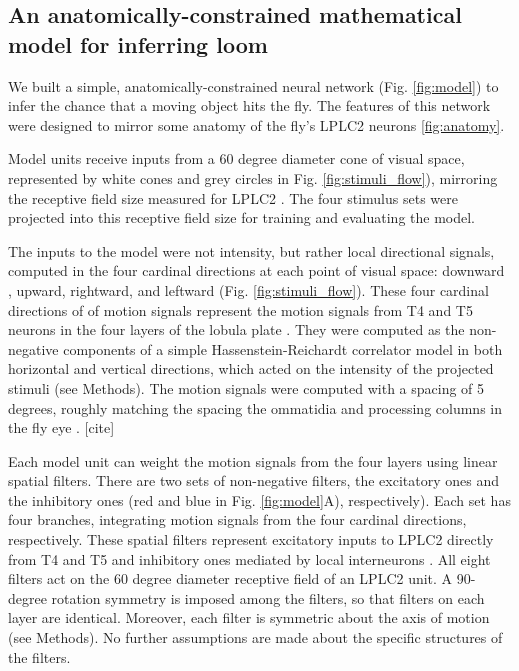 \documentclass[pdftex,9pt,lineno]{elife}
\begin{document}

\subsection{An anatomically-constrained mathematical model for inferring loom}

We built a simple, anatomically-constrained neural network (Fig. \ref{fig:model}) to infer the chance that a moving object hits the fly. The features of this network were designed to mirror some anatomy of the fly's LPLC2 neurons \ref{fig:anatomy}.

Model units receive inputs from a 60 degree diameter cone of visual space, represented by white cones and grey circles in Fig. \ref{fig:stimuli_flow}), mirroring the receptive field size measured for LPLC2 \citep{klapoetke2017ultra}. The four stimulus sets were projected into this receptive field size for training and evaluating the model.

The inputs to the model were not intensity, but rather local directional signals, computed in the four cardinal directions at each point of visual space: downward , upward, rightward, and leftward (Fig. \ref{fig:stimuli_flow}). These four cardinal directions of of motion signals represent the motion signals from T4 and T5 neurons in the four layers of the lobula plate \citep{maisak2013directional}. They were computed as the non-negative components of a simple Hassenstein-Reichardt correlator model \citep{hassenstein1956systemtheoretische} in both horizontal and vertical directions, which acted on the intensity of the projected stimuli (see Methods). The motion signals were computed with a spacing of 5 degrees, roughly matching the spacing the ommatidia and processing columns in the fly eye \citep{stavenga2003angular}. [cite]

Each model unit can weight the motion signals from the four layers using linear spatial filters. There are two sets of non-negative filters, the excitatory ones and the inhibitory ones (red and blue in Fig. \ref{fig:model}A), respectively). Each set has four branches, integrating motion signals from the four cardinal directions, respectively. These spatial filters represent excitatory inputs to LPLC2 directly from T4 and T5 and inhibitory ones mediated by local interneurons \citep{klapoetke2017ultra,mauss2015neural}. All eight filters act on the 60 degree diameter receptive field of an LPLC2 unit. A 90-degree rotation symmetry is imposed among the filters, so that filters on each layer are identical. Moreover, each filter is symmetric about the axis of motion (see Methods). No further assumptions are made about the specific structures of the filters.
\end{document}
